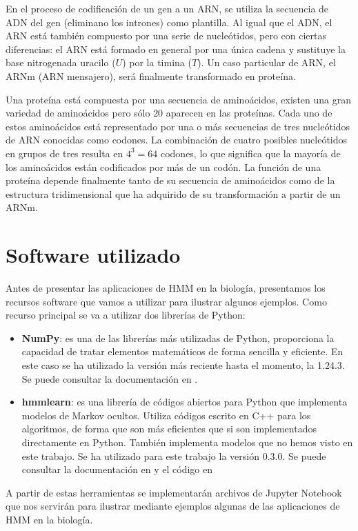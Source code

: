 En el proceso de codificación de un gen a un ARN, se utiliza la secuencia de ADN del gen (eliminano los intrones) como plantilla. Al igual que el ADN, el ARN está también compuesto por una serie de nucleótidos, pero con ciertas diferencias: el ARN está formado en general por una única cadena y sustituye la base nitrogenada uracilo ($U$) por la timina ($T$). Un caso particular de ARN, el ARNm (ARN mensajero), será finalmente transformado en proteína.

Una proteína está compuesta por una secuencia de aminoácidos, existen una gran variedad de aminoácidos pero sólo $20$ aparecen en las proteínas. Cada uno de estos aminoácidos está representado por una o más secuencias de tres nucleótidos de ARN conocidas como codones. La combinación de cuatro posibles nucleótidos en grupos de tres resulta en $4^3=64$ codones, lo que significa que la mayoría de los aminoácidos están codificados por más de un codón. La función de una proteína depende finalmente tanto de su secuencia de aminoácidos como de la estructura tridimensional que ha adquirido de su transformación a partir de un ARNm. 

\section{Software utilizado}
Antes de presentar las aplicaciones de HMM en la biología, presentamos los recursos software que vamos a utilizar para ilustrar algunos ejemplos. Como recurso principal se va a utilizar dos librerías de Python:
\begin{itemize}
    \item \textbf{NumPy}: es una de las librerías más utilizadas de Python, proporciona la capacidad de tratar elementos matemáticos de forma sencilla y eficiente. En este caso se ha utilizado la versión más reciente hasta el momento, la 1.24.3. Se puede consultar la documentación en \cite{numpy}.
    \item \textbf{hmmlearn}: es una librería de códigos abiertos para Python que implementa modelos de Markov ocultos. Utiliza códigos escrito en C++ para los algoritmos, de forma que son más eficientes que si son implementados directamente en Python. También implementa modelos que no hemos visto en este trabajo. Se ha utilizado para este trabajo la versión 0.3.0. Se puede consultar la documentación en \cite{hmmlearn} y el código en \cite{hmmlearnGithub}
\end{itemize}
A partir de estas herramientas se implementarán archivos de Jupyter Notebook que nos servirán para ilustrar mediante ejemplos algunas de las aplicaciones de HMM en la biología. 

